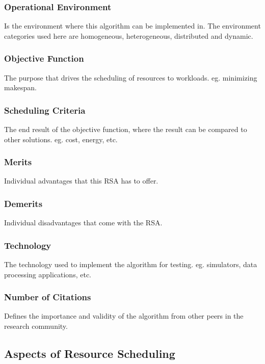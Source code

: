 \documentclass[12pt]{article}
\begin{document}
\subsubsection{Operational Environment} Is the environment where this algorithm can be implemented in. The environment categories used here are homogeneous, heterogeneous, distributed and dynamic.

\subsubsection{Objective Function} The purpose that drives the scheduling of resources to workloads. eg. minimizing makespan.

\subsubsection{Scheduling Criteria} The end result of the objective function, where the result can be compared to other solutions. eg. cost, energy, etc.

\subsubsection{Merits} Individual advantages that this RSA has to offer.

\subsubsection{Demerits} Individual disadvantages that come with the RSA.

\subsubsection{Technology} The technology used to implement the algorithm for testing. eg. simulators, data processing applications, etc.

\subsubsection{Number of Citations} Defines the importance and validity of the algorithm from other peers in the research community.


\subsection{Aspects of Resource Scheduling} \label{sub:schedulingaspects}
\end{document}
